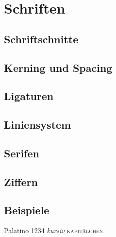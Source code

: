 \chapter{Schriften}
\label{ch:Schriften}


\section{Schriftschnitte}
\label{sec:Schnitte}

\section{Kerning und Spacing}
\label{sec:KernSpace}

\section{Ligaturen}

\section{Liniensystem}
\label{sec:Linien}

\section{Serifen}

\section{Ziffern}
\label{sec:Ziffern}

\section{Beispiele}

{\selectfont Palatino 1234 \emph{kursiv} \textsc{kapitälchen}}

